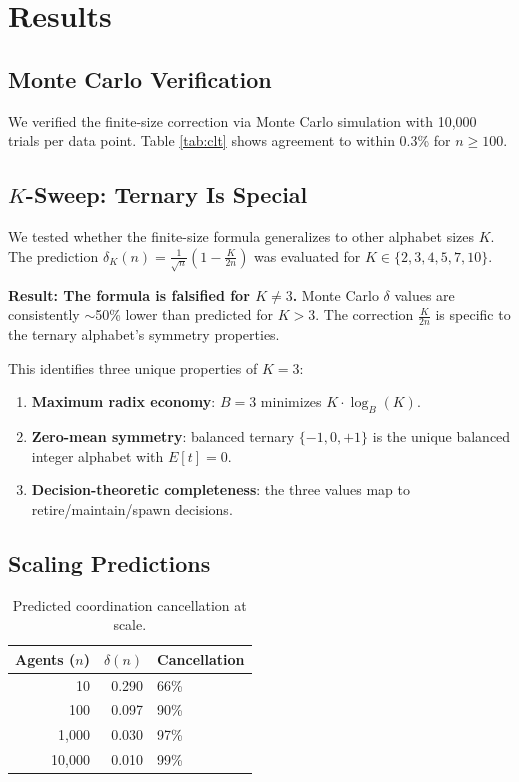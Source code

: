 \documentclass[11pt,a4paper]{article}
\newcommand{\trit}{\{-1,0,+1\}}
\begin{document}
\section{Results}

\subsection{Monte Carlo Verification}

We verified the finite-size correction via Monte Carlo simulation with 10,000 trials per data point. Table \ref{tab:clt} shows agreement to within 0.3\% for $n \geq 100$.

\subsection{$K$-Sweep: Ternary Is Special}

We tested whether the finite-size formula generalizes to other alphabet sizes $K$. The prediction $\delta_K(n) = \frac{1}{\sqrt{n}}\left(1 - \frac{K}{2n}\right)$ was evaluated for $K \in \{2, 3, 4, 5, 7, 10\}$.

\textbf{Result: The formula is falsified for $K \neq 3$.} Monte Carlo $\delta$ values are consistently $\sim$50\% lower than predicted for $K > 3$. The correction $\frac{K}{2n}$ is specific to the ternary alphabet's symmetry properties.

This identifies three unique properties of $K = 3$:
\begin{enumerate}
\item \textbf{Maximum radix economy}: $B = 3$ minimizes $K \cdot \log_B(K)$.
\item \textbf{Zero-mean symmetry}: balanced ternary $\trit$ is the unique balanced integer alphabet with $E[t] = 0$.
\item \textbf{Decision-theoretic completeness}: the three values map to retire/maintain/spawn decisions.
\end{enumerate}

\subsection{Scaling Predictions}

\begin{table}[h]
\centering
\begin{tabular}{rrl}
\toprule
Agents ($n$) & $\delta(n)$ & Cancellation \\
\midrule
10 & 0.290 & 66\% \\
100 & 0.097 & 90\% \\
1,000 & 0.030 & 97\% \\
10,000 & 0.010 & 99\% \\
\bottomrule
\end{tabular}
\caption{Predicted coordination cancellation at scale.}
\end{table}
\end{document}
